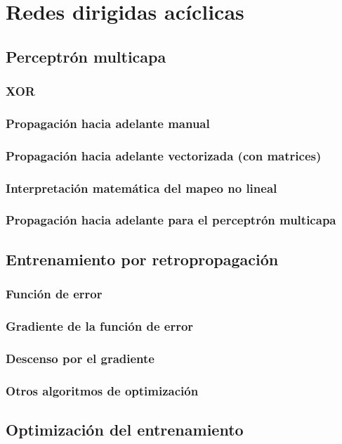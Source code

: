 \documentclass[12pt,openany]{book}
\begin{document}
\part{Redes dirigidas acíclicas}
\chapter{Perceptrón multicapa}
\section{XOR}
\section{Propagación hacia adelante manual}
\section{Propagación hacia adelante vectorizada (con matrices)}
\section{Interpretación matemática del mapeo no lineal}
\section{Propagación hacia adelante para el perceptrón multicapa}


\chapter{Entrenamiento por retropropagación}
\section{Función de error}
\section{Gradiente de la función de error}
\section{Descenso por el gradiente}
\section{Otros algoritmos de optimización}

\chapter{Optimización del entrenamiento} 
\end{document}
